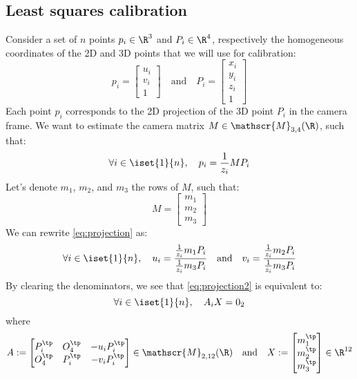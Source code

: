 \subsection{Least squares calibration}
Consider a set of $n$ points $p_i\in\R^3$ and $P_i\in\R^4$, respectively the homogeneous coordinates of the 2D and 3D points that we will use for calibration:
\begin{equation*}
    p_i = \begin{bmatrix} u_i \\ v_i \\ 1 \end{bmatrix} \quad\text{and}\quad P_i = \begin{bmatrix} x_i \\ y_i \\ z_i \\ 1 \end{bmatrix}
\end{equation*}
Each point $p_i$ corresponds to the 2D projection of the 3D point $P_i$ in the camera frame. We want to estimate the camera matrix $M\in\mathscr{M}_{3,4}(\R)$, such that:
\begin{equation}
    \label{eq:projection}
    \forall i\in\iset{1}{n}, \quad p_i = \frac{1}{z_i}MP_i
\end{equation}
Let's denote $m_1$, $m_2$, and $m_3$ the rows of $M$, such that:
\begin{equation*}
    M = \begin{bmatrix} m_1 \\ m_2 \\ m_3 \end{bmatrix}
\end{equation*}
We can rewrite \eqref{eq:projection} as:
\begin{equation}
    \label{eq:projection2}
    \forall i\in\iset{1}{n}, \quad u_i = \frac{\frac{1}{z_i}m_1P_i}{\frac{1}{z_i}m_3P_i} \quad\text{and}\quad v_i = \frac{\frac{1}{z_i}m_2P_i}{\frac{1}{z_i}m_3P_i}
\end{equation}
By clearing the denominators, we see that \eqref{eq:projection2} is equivalent to:
\begin{equation}
    \label{eq:projection3}
    \forall i\in\iset{1}{n}, \quad A_iX = 0_2
\end{equation}
where
\begin{equation*}
    A := \begin{bmatrix}
        P_i^\tp & O_4^\tp & -u_iP_i^\tp \\
        O_4^\tp & P_i^\tp & -v_iP_i^\tp
    \end{bmatrix}\in\mathscr{M}_{2,12}(\R)
    \quad\text{and}\quad
    X := \begin{bmatrix} m_1^\tp \\ m_2^\tp \\ m_3^\tp \end{bmatrix}\in\R^{12}
\end{equation*}

